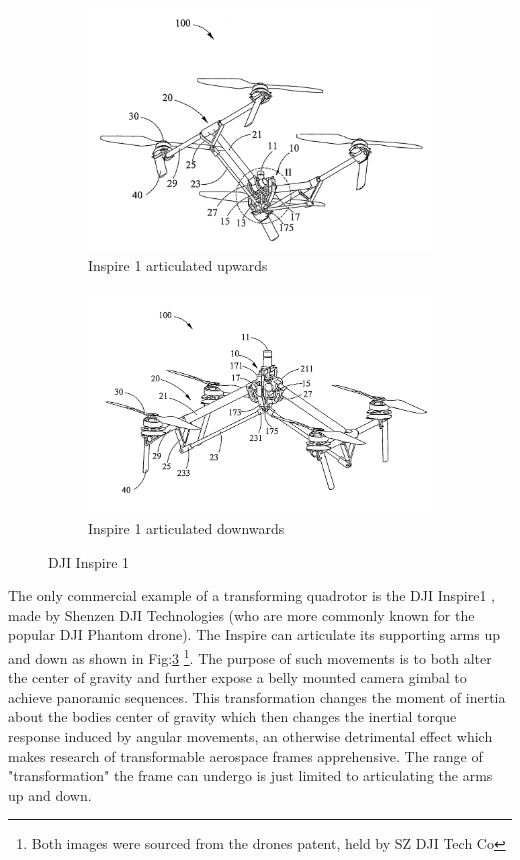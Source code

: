 \begin{figure}[htbp]
\centering
\begin{subfigure}{.5\textwidth}
\centering
\includegraphics[width=\textwidth]{figs/dji-inspire1}
\caption{Inspire 1 articulated upwards}
\label{fig:inspireup}
\end{subfigure}%
\begin{subfigure}{.5\textwidth}
\centering
\includegraphics[width=\textwidth]{figs/dji-inspire2}
\caption{Inspire 1 articulated downwards}
\label{fig:inspiredown}
\end{subfigure}
\caption{DJI Inspire 1}
\label{fig:inspire1}
\end{figure}
The only commercial example of a transforming quadrotor is the DJI Inspire1 \cite{inspire}, made by Shenzen DJI Technologies (who are more commonly known for the popular DJI Phantom drone). The Inspire can articulate its supporting arms up and down as shown in Fig:\ref{fig:inspire1} \footnote{Both images were sourced from the drones patent, held by SZ DJI Tech Co\cite{djinspire}}. The purpose of such movements is to both alter the center of gravity and further expose a belly mounted camera gimbal to achieve panoramic sequences. This transformation changes the moment of inertia about the bodies center of gravity which then changes the inertial torque response induced by angular movements, an otherwise detrimental effect which makes research of transformable aerospace frames apprehensive. The range of "transformation" the frame can undergo is just limited to articulating the arms up and down.

